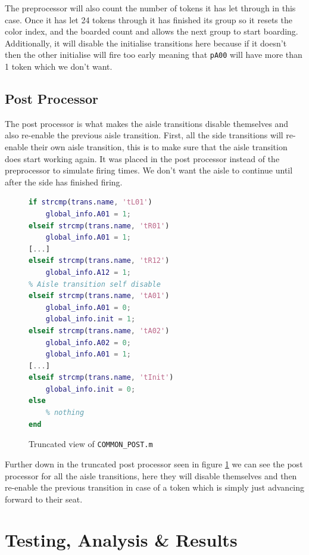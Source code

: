 \documentclass[english]{article}
\begin{document}
The preprocessor will also count the number of tokens it has let through in this case. Once it has let 24 tokens through it has finished its group so it resets the color index, and the boarded count and allows the next group to start boarding. Additionally, it will disable the initialise transitions here because if it doesn't then the other initialise will fire too early meaning that \lstinline{pA00} will have more than 1 token which we don't want.


\subsection{Post Processor}
The post processor is what makes the aisle transitions disable themselves and also re-enable the previous aisle transition. First, all the side transitions will re-enable their own aisle transition, this is to make sure that the aisle transition does start working again. It was placed in the post processor instead of the preprocessor to simulate firing times. We don't want the aisle to continue until after the side has finished firing. 

\begin{figure}[H]
    \centering
\begin{lstlisting}[language=MATLAB]
% re-enable the aisle transition after the side transition has finished firing. 
if strcmp(trans.name, 'tL01')
    global_info.A01 = 1;
elseif strcmp(trans.name, 'tR01')
    global_info.A01 = 1;
[...]
elseif strcmp(trans.name, 'tR12')
    global_info.A12 = 1;
% Aisle transition self disable
elseif strcmp(trans.name, 'tA01')
    global_info.A01 = 0;
    global_info.init = 1;
elseif strcmp(trans.name, 'tA02')
    global_info.A02 = 0;
    global_info.A01 = 1;
[...]
elseif strcmp(trans.name, 'tInit')
    global_info.init = 0;
else
    % nothing
end
\end{lstlisting}
    \caption{Truncated view of \lstinline{COMMON_POST.m}}
    \label{fig:commonpost}
\end{figure}

Further down in the truncated post processor seen in figure \ref{fig:commonpost} we can see the post processor for all the aisle transitions, here they will disable themselves and then re-enable the previous transition in case of a token which is simply just advancing forward to their seat. 





\section{Testing, Analysis \& Results}
\end{document}
